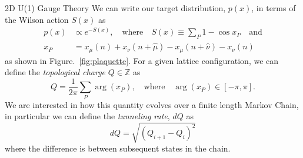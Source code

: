 \documentclass[final]{beamer}
\newlength{\colwidth}
\begin{document}
\begin{frame}[t]
\begin{columns}[t]
\begin{column}{\colwidth}
\begin{block}{2D U(1) Gauge Theory}
    We can write our target distribution, \(p(x)\), in terms of the Wilson action \(S(x)\) as
    \begin{align}
      p(x)&\propto e^{- S(x)}, \quad \text{where}\quad S(x) \equiv \sum_{P} 1 - \cos x_{P}\quad\text{and}\\
      x_{P} &= x_{\mu}(n) + x_{\nu}(n+\hat{\mu})-x_{\mu}(n+\hat{\nu}) - x_{\nu}(n)
    \end{align}
    as shown in Figure.~\ref{fig:plaquette}.
    For a given lattice configuration, we can define the \emph{topological charge} \(Q \in \mathbb{Z}\) as
    \begin{equation}
      Q = \frac{1}{2\pi}\sum_{P} \arg(x_{P}), \quad\text{where}\quad \arg(x_{P}) \in [-\pi,\pi].
    \end{equation}
    We are interested in how this quantity evolves over a finite length Markov Chain, in particular we can define the
    \emph{tunneling rate}, \(dQ\) as
    \begin{equation}
      dQ = \sqrt{(Q_{i+1} - Q_{i})^2}
    \end{equation}
    where the difference is between subsequent states in the chain.
  \end{block}


\end{column}
\end{columns}
\end{frame}
\end{document}

